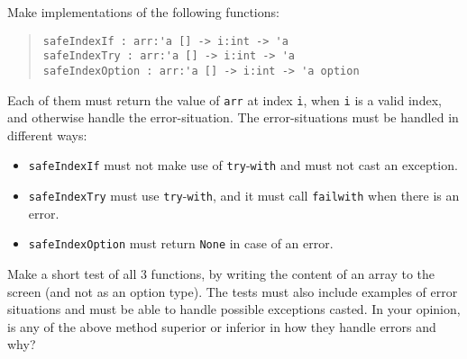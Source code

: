 Make implementations of the following functions:
\begin{quote}
  \mbox{\lstinline!safeIndexIf : arr:'a [] -> i:int -> 'a!}
  \\\mbox{\lstinline!safeIndexTry : arr:'a [] -> i:int -> 'a!}
  \\\mbox{\lstinline!safeIndexOption : arr:'a [] -> i:int -> 'a option!}
\end{quote}
Each of them must return the value of \lstinline!arr! at index \lstinline!i!, when \lstinline!i! is a valid index, and otherwise handle the error-situation.  The error-situations must be handled in different ways:
  \begin{itemize}
  \item \lstinline!safeIndexIf! must not make use of \lstinline!try!-\lstinline!with! and must not cast an exception.
  \item \lstinline!safeIndexTry! must use \lstinline!try!-\lstinline!with!, and it must call \lstinline!failwith! when there is an error. 
  \item \lstinline!safeIndexOption! must return \lstinline!None! in case of an error. 
  \end{itemize}
  Make a short test of all 3 functions, by writing the content of an array to the screen (and not as an option type). The tests must also include examples of error situations and must be able to handle possible exceptions casted. In your opinion, is any of the above method superior or inferior in how they handle errors and why?